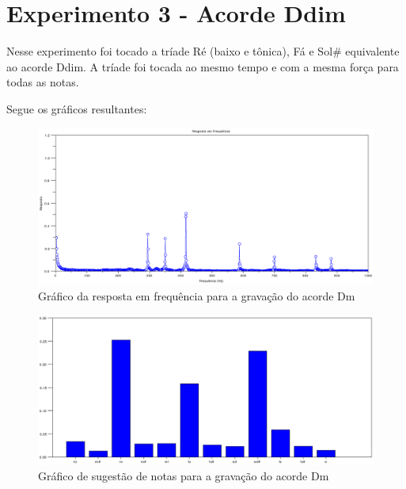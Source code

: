 \section{Experimento 3 - Acorde Ddim}
\label{sec:experimento3}

Nesse experimento foi tocado a tríade Ré (baixo e tônica), Fá e Sol\# equivalente ao acorde Ddim. A tríade foi tocada ao mesmo tempo e com a mesma força para todas as notas.

Segue os gráficos resultantes:

\begin{figure}[h]
	\centering
		\includegraphics[keepaspectratio=true,scale=0.49]{figuras/Dm/fft_Ddim.eps}
	\caption{Gráfico da resposta em frequência para a gravação do acorde Dm}
\end{figure}

\begin{figure}[h]
	\centering
		\includegraphics[keepaspectratio=true,scale=0.49]{figuras/Dm/notas_Ddim.eps}
	\caption{Gráfico de sugestão de notas para a gravação do acorde Dm}
\end{figure}

